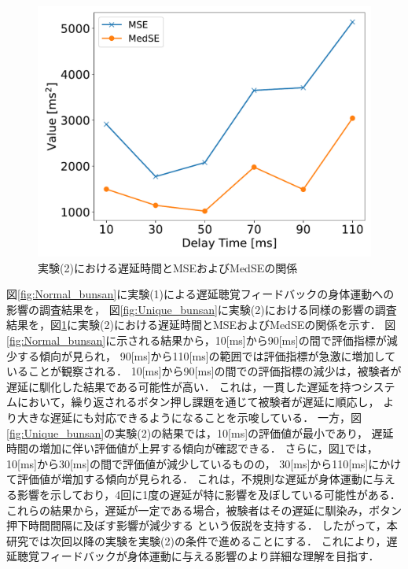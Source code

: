 \begin{figure}[bt]
  \centering
  \includegraphics[scale=0.5]{figures/Yobi/Var/Yobi-MSE-MedSE.pdf}
  \caption{実験(2)における遅延時間とMSEおよびMedSEの関係}
  \label{fig:Yobi_MSE_MedSE}
\end{figure}
図\ref{fig:Normal_bunsan}に実験(1)による遅延聴覚フィードバックの身体運動への影響の調査結果を，
図\ref{fig:Unique_bunsan}に実験(2)における同様の影響の調査結果を，図\ref{fig:Yobi_MSE_MedSE}に実験(2)における遅延時間とMSEおよびMedSEの関係を示す．
図\ref{fig:Normal_bunsan}に示される結果から，10[ms]から90[ms]の間で評価指標が減少する傾向が見られ，
90[ms]から110[ms]の範囲では評価指標が急激に増加していることが観察される．
10[ms]から90[ms]の間での評価指標の減少は，被験者が遅延に馴化した結果である可能性が高い．
これは，一貫した遅延を持つシステムにおいて，繰り返されるボタン押し課題を通じて被験者が遅延に順応し，
より大きな遅延にも対応できるようになることを示唆している．
一方，図\ref{fig:Unique_bunsan}の実験(2)の結果では，10[ms]の評価値が最小であり，
遅延時間の増加に伴い評価値が上昇する傾向が確認できる．
さらに，図\ref{fig:Yobi_MSE_MedSE}では，10[ms]から30[ms]の間で評価値が減少しているものの，
30[ms]から110[ms]にかけて評価値が増加する傾向が見られる．
これは，不規則な遅延が身体運動に与える影響を示しており，4回に1度の遅延が特に影響を及ぼしている可能性がある．
これらの結果から，遅延が一定である場合，被験者はその遅延に馴染み，ボタン押下時間間隔に及ぼす影響が減少する
という仮説を支持する．
したがって，本研究では次回以降の実験を実験(2)の条件で進めることにする．
これにより，遅延聴覚フィードバックが身体運動に与える影響のより詳細な理解を目指す．

\newpage \newpage
